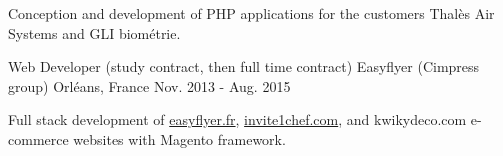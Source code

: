 \begin{cventries}
{\begin{cvitems}
        \item {Conception and development of PHP applications for the customers Thalès Air Systems and GLI biométrie.}
      \end{cvitems}
    }
  \cventry
    {Web Developer (study contract, then full time contract)}
    {Easyflyer (Cimpress group)}
    {Orléans, France}
    {Nov. 2013 - Aug. 2015}
    {
      \begin{cvitems}
        \item {Full stack development of \href{https://www.easyflyer.fr}{easyflyer.fr}, \href{https://www.invite1chef.com}{invite1chef.com}, and kwikydeco.com e-commerce websites with Magento framework.}
      \end{cvitems}
    }
\end{cventries}
